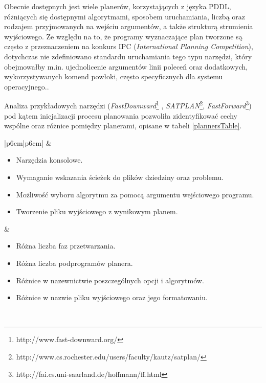 Obecnie dostępnych jest wiele planerów, korzystających z języka PDDL, różniących się dostępnymi algorytmami, sposobem uruchamiania, liczbą oraz rodzajem przyjmowanych na wejściu argumentów, a także strukturą strumienia wyjściowego. Ze względu na to, że programy wyznaczające plan tworzone są często z przeznaczeniem na konkurs IPC (\emph{International Planning Competition}), dotychczas nie zdefiniowano standardu uruchamiania tego typu narzędzi, który obejmowałby m.in. ujednolicenie argumentów linii poleceń oraz dodatkowych, wykorzystywanych komend powłoki, często specyficznych dla systemu operacyjnego..

Analiza przykładowych narzędzi (\emph{FastDownward}\footnote{http://www.fast-downward.org/} , \emph{SATPLAN}\footnote{http://www.cs.rochester.edu/users/faculty/kautz/satplan/}, \emph{FastForward}\footnote{http://fai.cs.uni-saarland.de/hoffmann/ff.html}) pod kątem inicjalizacji procesu planowania pozwoliła zidentyfikować cechy wspólne oraz różnice pomiędzy planerami, opisane w tabeli \ref{plannersTable}.
\begin{table}[h]
\centering
\caption{Cechy wspólne oraz różnice w uruchamianiu pomiędzy przykładowymi planerami.}
\label{plannersTable}
\begin{tabular}{|p{6cm}|p{6cm}|}
\hline
{} 
    &  
   \\
   \hline
\begin{itemize}
\item Narzędzia konsolowe.
\item Wymaganie wskazania ścieżek do plików dziedziny oraz problemu.
\item Możliwość wyboru algorytmu za pomocą argumentu wejściowego programu.
\item Tworzenie pliku wyjściowego z wynikowym planem.
\end{itemize}
&
\begin{itemize}
\item Różna liczba faz przetwarzania.
\item Różna liczba podprogramów planera.
\item Różnice w nazewnictwie poszczególnych opcji i algorytmów.
\item Różnice w nazwie pliku wyjściowego oraz jego formatowaniu.
\end{itemize} \\
\hline
\end{tabular}
\end{table}

